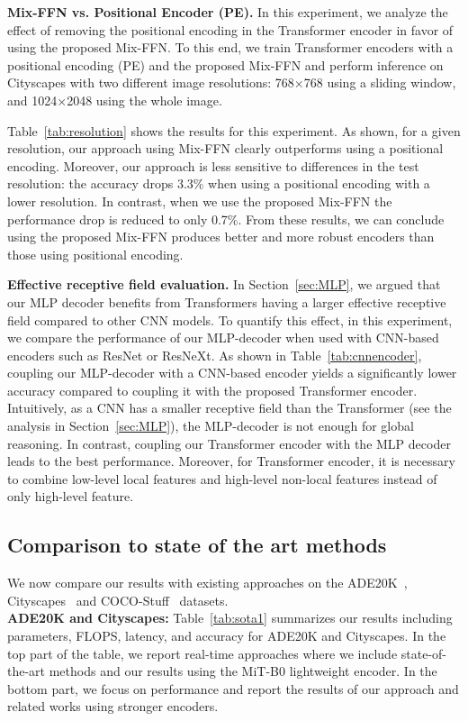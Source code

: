\textbf{Mix-FFN vs. Positional Encoder (PE).} 
In this experiment, we analyze the effect of removing the positional encoding in the Transformer encoder in favor of using the proposed Mix-FFN. To this end, we train Transformer encoders with a positional encoding (PE) and the proposed Mix-FFN and perform inference on Cityscapes with two different image resolutions: 768$\times$768 using a sliding window, and 1024$\times$2048 using the whole image.

Table~\ref{tab:resolution} shows the results for this experiment. As shown, for a given resolution, our approach using Mix-FFN clearly outperforms using a positional encoding. Moreover, our approach is less sensitive to differences in the test resolution: the accuracy drops 3.3\% when using a positional encoding with a lower resolution. In contrast, when we use the proposed Mix-FFN the performance drop is reduced to only 0.7\%. From these results, we can conclude using the proposed Mix-FFN produces better and more robust encoders than those using positional encoding. 


\textbf{Effective receptive field evaluation.} 
In Section~\ref{sec:MLP}, we argued that our MLP decoder benefits from Transformers having a larger effective receptive field compared to other CNN models. To quantify this effect, in this experiment, we compare the performance of our MLP-decoder when used with CNN-based encoders such as ResNet or ResNeXt. As shown in Table~\ref{tab:cnnencoder}, coupling our MLP-decoder with a CNN-based encoder yields a significantly lower accuracy compared to coupling it with the proposed Transformer encoder. Intuitively, as a CNN has a smaller receptive field than the Transformer (see the analysis in Section~\ref{sec:MLP}), the MLP-decoder is not enough for global reasoning. In contrast, coupling our Transformer encoder with the MLP decoder leads to the best performance. 
%
Moreover, for Transformer encoder, it is necessary to combine low-level local features and high-level non-local features instead of only high-level feature. 


\subsection{Comparison to state of the art methods}
We now compare our results with existing approaches on the ADE20K~\cite{ade20k}, Cityscapes~\cite{cityscape} and COCO-Stuff~\cite{cocostuff} datasets. 
\\ \textbf{ADE20K and Cityscapes:} 
Table~\ref{tab:sota1} summarizes our results including parameters, FLOPS, latency, and accuracy for ADE20K and Cityscapes. 
In the top part of the table, we report real-time approaches where we include state-of-the-art methods and our results using the MiT-B0 lightweight encoder. In the bottom part, we focus on performance and report the results of our approach and related works using stronger encoders.  

